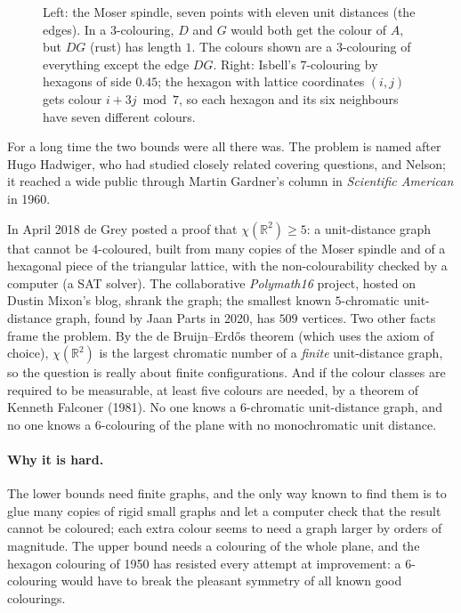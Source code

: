 \begin{figure}[ht]
\centering
{}
\caption{Left: the Moser spindle, seven points with eleven unit distances (the edges). In a $3$-colouring, $D$ and $G$ would both get the colour of $A$,
but $DG$ (rust) has length $1$. The colours shown are a $3$-colouring of everything except the edge $DG$. Right: Isbell's $7$-colouring by hexagons of
side $0.45$; the hexagon with lattice coordinates $(i,j)$ gets colour $i+3j\bmod7$, so each hexagon and its six neighbours have seven different colours.}
\label{conjectures:fig:spindle}
\end{figure}

For a long time the two bounds were all there was. The problem is named after Hugo Hadwiger, who had studied closely related covering questions, and
Nelson; it reached a wide public through Martin Gardner's column in \emph{Scientific American} in 1960.

\begin{remark}\label{conjectures:rem:degrey}
In April 2018 de Grey posted a proof that $\chi(\mathbb R^2)\ge5$: a unit-distance graph that cannot be $4$-coloured, built from many copies of the Moser
spindle and of a hexagonal piece of the triangular lattice, with the non-colourability checked by a computer (a SAT solver). The collaborative
\emph{Polymath16} project, hosted on Dustin Mixon's blog, shrank the graph; the smallest known $5$-chromatic unit-distance
graph, found by Jaan Parts in 2020, has $509$ vertices. Two other facts frame the problem. By the de Bruijn--Erd\H os theorem (which uses the axiom of
choice), $\chi(\mathbb R^2)$ is the largest chromatic number of a \emph{finite} unit-distance graph, so the question is really about finite
configurations. And if the colour classes are required to be measurable, at least five colours are needed, by a theorem of Kenneth Falconer (1981). No
one knows a $6$-chromatic unit-distance graph, and no one knows a $6$-colouring of the plane with no monochromatic unit distance.
\end{remark}

\paragraph{Why it is hard.} The lower bounds need finite graphs, and the only way known to find them is to glue many copies of rigid small graphs and
let a computer check that the result cannot be coloured; each extra colour seems to need a graph larger by orders of magnitude. The upper bound needs a
colouring of the whole plane, and the hexagon colouring of 1950 has resisted every attempt at improvement: a $6$-colouring would have to break the
pleasant symmetry of all known good colourings.

